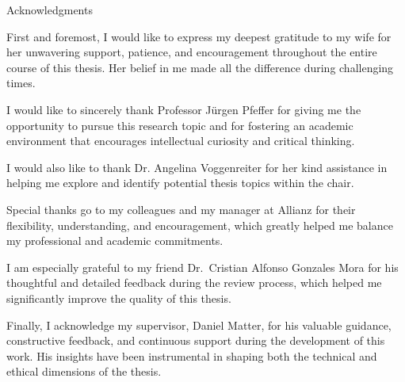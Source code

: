 \thispagestyle{empty}

\vspace*{20mm}

\begin{center}
    { Acknowledgments}
\end{center}

\vspace{10mm}


First and foremost, I would like to express my deepest gratitude to my wife for her unwavering support, patience,
and encouragement throughout the entire course of this thesis. Her belief in me made all the difference during
challenging times.

I would like to sincerely thank Professor Jürgen Pfeffer for giving me the opportunity to pursue this research topic
and for fostering an academic environment that encourages intellectual curiosity and critical thinking.

I would also like to thank Dr. Angelina Voggenreiter for her kind assistance in helping me explore and identify
potential thesis topics within the chair.

Special thanks go to my colleagues and my manager at Allianz for their flexibility, understanding, and
encouragement, which greatly helped me balance my professional and academic commitments.

I am especially grateful to my friend Dr.\ Cristian Alfonso Gonzales Mora for his thoughtful and detailed feedback
during the review process, which helped me significantly improve the quality of this thesis.

Finally, I acknowledge my supervisor, Daniel Matter, for his valuable guidance, constructive feedback, and
continuous support during the development of this work. His insights have been instrumental in shaping both the
technical and ethical dimensions of the thesis.

\cleardoublepage{}
